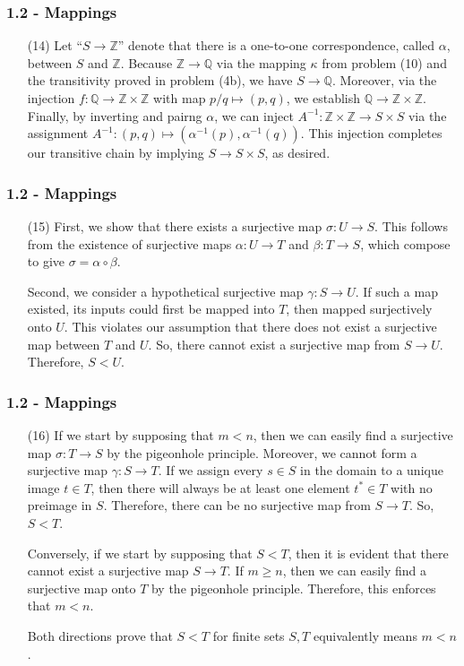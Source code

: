 \documentclass{beamer}
\begin{document}
\begin{frame}
\frametitle{1.2 - Mappings}
\small
\begin{enumerate}
	\item[(14)] Let ``$S\to\mathbb Z$'' denote that there is a one-to-one correspondence, called $\alpha$, between $S$ and $\mathbb Z$. Because $\mathbb Z\to\mathbb Q$ via the mapping $\kappa$ from problem (10) and the transitivity proved in problem (4b), we have $S\to\mathbb Q$. Moreover, via the injection $f: \mathbb Q\to \mathbb Z\times\mathbb Z$ with map $p/q \mapsto (p, q)$, we establish $\mathbb Q \to\mathbb Z\times\mathbb Z$. Finally, by inverting and pairng $\alpha$, we can inject $A^{-1}: \mathbb Z\times \mathbb Z\to S\times S$ via the assignment $A^{-1}: (p,q)\mapsto (\alpha^{-1}(p), \alpha^{-1}(q))$. This injection completes our transitive chain by implying $S\to S\times S$, as desired.
\end{enumerate}
\end{frame}
\begin{frame}
\frametitle{1.2 - Mappings}
\small
\begin{enumerate}
	\item[(15)] \quad First, we show that there exists a surjective map $\sigma: U\to S$. This follows from the existence of surjective maps $\alpha: U\to T$ and $\beta: T\to S$, which compose to give $\sigma = \alpha\circ\beta$. 
	
	\quad Second, we consider a hypothetical surjective map $\gamma: S\to U$. If such a map existed, its inputs could first be mapped into $T$, then mapped surjectively onto $U$. This violates our assumption that there does not exist a surjective map between $T$ and $U$. So, there cannot exist a surjective map from $S\to U$. Therefore, $S<U$.
\end{enumerate}
\end{frame}
\begin{frame}
\frametitle{1.2 - Mappings}
\small
\begin{enumerate}
	\item[(16)] \quad If we start by supposing that $m<n$, then we can easily find a surjective map $\sigma: T\to S$ by the pigeonhole principle. Moreover, we cannot form a surjective map $\gamma: S\to T$. If we assign every $s\in S$ in the domain to a unique image $t\in T$, then there will always be at least one element $t^*\in T$ with no preimage in $S$. Therefore, there can be no surjective map from $S\to T$. So, $S<T$.
	
	\quad Conversely, if we start by supposing that $S<T$, then it is evident that there cannot exist a surjective map $S\to T$. If $m\geq n$, then we can easily find a surjective map onto $T$ by the pigeonhole principle. Therefore, this enforces that $m<n$.
	
	\quad Both directions prove that $S<T$ for finite sets $S,T$ equivalently means $m<n$.
\end{enumerate}
\end{frame}
\end{document}
